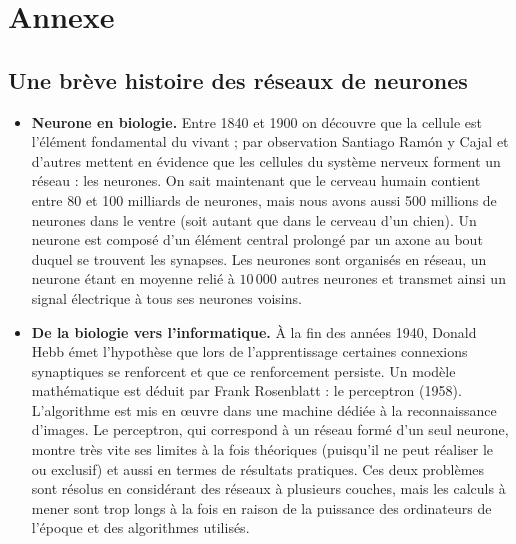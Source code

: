 \documentclass[11pt,class=report,crop=false]{standalone}
\begin{document}
\setcounter{section}{0}

\chapter*{Annexe}



\section{Une brève histoire des réseaux de neurones}

\begin{itemize}
  \item \textbf{Neurone en biologie.} Entre 1840 et 1900 on découvre que la cellule est l'élément fondamental du vivant ; par observation Santiago Ram\'on y Cajal et d'autres mettent en évidence que les cellules du système nerveux forment un réseau : les neurones.
  On sait maintenant que le cerveau humain contient entre 80 et 100 milliards de neurones, mais nous avons aussi 500 millions de neurones dans le ventre (soit autant que dans le cerveau d'un chien).
  Un neurone est composé d'un élément central prolongé par un axone au bout duquel se trouvent les synapses. Les neurones sont organisés en réseau, un neurone étant en moyenne relié à $10\,000$ autres neurones et transmet ainsi un signal électrique à tous ses neurones voisins. 
    
  \item \textbf{De la biologie vers l'informatique.} À la fin des années 1940, Donald Hebb  émet l'hypothèse que lors de l'apprentissage certaines connexions synaptiques se renforcent et que ce renforcement persiste. Un modèle mathématique est déduit par Frank Rosenblatt : le perceptron (1958). L'algorithme est mis en \oe uvre dans une machine dédiée à la reconnaissance d'images. 
  Le perceptron, qui correspond à un réseau formé d'un seul neurone, montre très vite ses limites à la fois théoriques (puisqu'il ne peut réaliser le \og{}ou exclusif\fg{}) et aussi en termes de résultats pratiques. Ces deux problèmes sont résolus en considérant des réseaux à plusieurs couches,  mais les calculs à mener sont trop longs à la fois en raison de la puissance des ordinateurs de l'époque et des algorithmes utilisés.  
  

\end{itemize}
\end{document}
